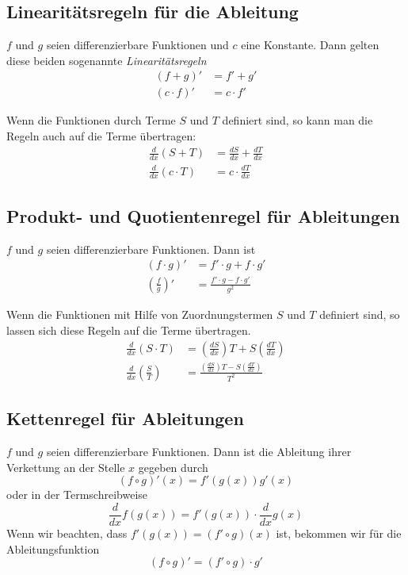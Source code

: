 \subsection{Linearitätsregeln für die Ableitung}

$f$ und $g$ seien differenzierbare Funktionen und $c$ eine Konstante. Dann gelten
diese beiden sogenannte \textit{Linearitätsregeln}
\begin{align*}
	(f + g)'& = f' + g' \\
	(c \cdot f)'& = c \cdot f'
\end{align*}

Wenn die Funktionen durch Terme $S$ und $T$ definiert sind, so kann man die Regeln auch auf die
Terme übertragen:
\begin{align*}
	\frac{d}{dx}(S + T)& = \frac{dS}{dx} + \frac{dT}{dx} \\
	\frac{d}{dx}(c \cdot T)& = c \cdot \frac{dT}{dx}
\end{align*}


\subsection{Produkt- und Quotientenregel für Ableitungen}

$f$ und $g$ seien differenzierbare Funktionen. Dann ist
\begin{align*}
	(f \cdot g)'& = f' \cdot g + f \cdot g' \\
	\left(\frac{f}{g}\right)'& = \frac{f' \cdot g - f \cdot g'}{g^2}
\end{align*}

Wenn die Funktionen mit Hilfe von Zuordnungstermen $S$ und $T$ definiert sind, so lassen sich diese
Regeln auf die Terme übertragen.
\begin{align*}
	\frac{d}{dx}(S \cdot T)& = \left(\frac{dS}{dx}\right)T + S\left(\frac{dT}{dx}\right) \\
	\frac{d}{dx}\left(\frac{S}{T}\right)& = \frac{\left(\frac{dS}{dx}\right)T - S\left(\frac{dT}{dx}\right)}{T^2}
\end{align*}


\subsection{Kettenregel für Ableitungen}

$f$ und $g$ seien differenzierbare Funktionen. Dann ist die Ableitung ihrer Verkettung an der Stelle
$x$ gegeben durch
%
\begin{displaymath}
	(f \circ g)'(x) = f'(g(x))g'(x)
\end{displaymath}
%
oder in der Termschreibweise
%
\begin{displaymath}
	\frac{d}{dx}f(g(x)) = f'(g(x)) \cdot \frac{d}{dx}g(x)
\end{displaymath}
%
Wenn wir beachten, dass $f'(g(x)) = (f' \circ g)(x)$ ist, bekommen wir für die Ableitungsfunktion
%
\begin{displaymath}
	(f \circ g)' = (f' \circ g) \cdot g'
\end{displaymath}


